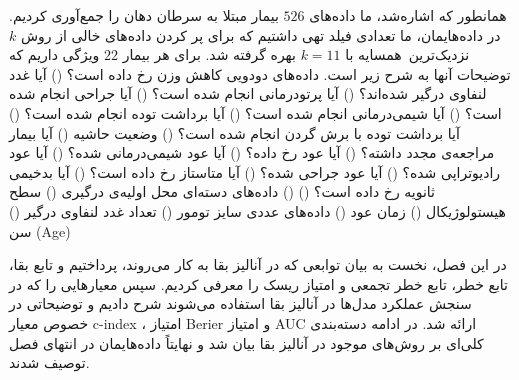 همانطور که اشاره‌شد، ما داده‌های $526$ بیمار مبتلا به سرطان دهان را جمع‌‌آوری کردیم.
در داده‌هایمان، ما تعدادی فیلد تهی داشتیم که برای پر کردن داده‌های خالی از روش $k$~نزدیک‌ترین~همسایه
با $k=11$ بهره گرفته شد.
برای هر بیمار $22$ ویژگی داریم که توضیحات آنها به شرح زیر است.
داده‌های دودویی
 کاهش وزن رخ داده است؟ ()
 آیا غدد لنفاوی درگیر شده‌اند؟ ()
 آیا پرتو‌درمانی انجام شده است؟ ()
 آیا جراحی انجام شده است؟ ()
 آیا شیمی‌درمانی انجام شده است؟ ()
 آیا برداشت توده انجام شده است؟ ()
 آیا برداشت توده با برش گردن انجام شده است؟ ()
 وضعیت حاشیه ()
 آیا بیمار مراجعه‌ی مجدد داشته؟ ()
 آیا عود رخ داده؟ ()
 آیا عود شیمی‌درمانی شده؟ ()
 آیا عود رادیوتراپی شده؟ ()
 آیا عود جراحی شده؟ ()
 آیا متاستاز رخ داده است؟ ()
 آیا بدخیمی ثانویه رخ داده است؟ ()
  ()
داده‌های دسته‌ای 
 محل اولیه‌ی درگیری ()
 سطح هیستولوژیکال ()
 زمان عود ()
 داده‌های عددی 
 سایز تومور ()
 تعداد غدد لنفاوی درگیر ()
 سن (Age)
  

در این فصل، نخست به بیان توابعی که در آنالیز بقا به کار می‌روند، پرداختیم و تابع بقا، تابع خطر، تابع خطر تجمعی و امتیاز ریسک را معرفی کردیم. سپس معیارهایی را که در سنجش عملکرد مدل‌ها در آنالیز بقا استفاده می‌شوند شرح دادیم و توضیحاتی در خصوص معیار c-index ، امتیاز Berier و امتیاز AUC ارائه شد. در ادامه دسته‌بندی کلی‌ای بر روش‌های موجود در آنالیز بقا بیان شد و نهایتاً داده‌هایمان در انتهای فصل توصیف شدند.





